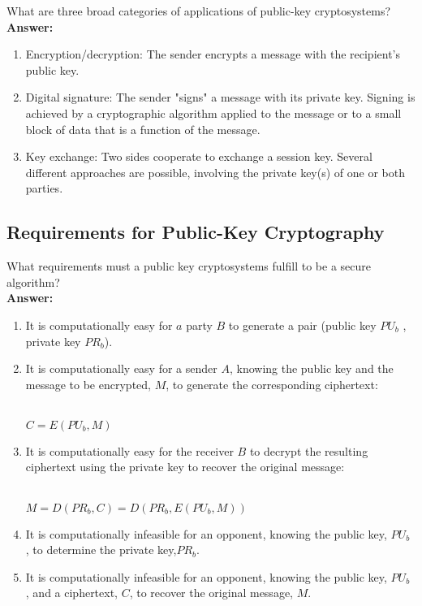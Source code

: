 \documentclass[paper=a4, fontsize=11pt]{scrartcl} %
\numberwithin{equation}{section} %
\numberwithin{figure}{section} %
\numberwithin{table}{section} %
\begin{document}
What are three broad categories of applications of public-key cryptosystems?\\

\textbf{Answer:}

 \begin{enumerate}
 \item Encryption/decryption: The sender encrypts a message with the recipient's public key.
 \item Digital signature: The sender "signs" a message with its private key. Signing is achieved by a cryptographic algorithm applied to the message or to a small block of data that is a function of the message.
 \item Key exchange: Two sides cooperate to exchange a session key. Several different approaches are possible, involving the private key(s) of one or both parties.
 \end{enumerate}

\subsection{Requirements for Public-Key Cryptography \uppercase\expandafter{}}

 What requirements must a public key cryptosystems fulfill to be a secure algorithm?\\

\textbf{Answer:}

 \begin{enumerate}
 \item It is computationally easy for $a$ party $B$ to generate a pair (public key $PU_{b}$ , private key $PR_{b}$).
 \item It is computationally easy for a sender $A$, knowing the public key and the message to be encrypted, $M$, to generate the corresponding ciphertext:\\
  \\
  \centerline{$C = E(PU_{b} , M)$}
 \item It is computationally easy for the receiver $B$ to decrypt the resulting ciphertext using the private key to recover the original message:\\
  \\
  \centerline{$M = D(PR_{b} , C) = D(PR_{b} , E(PU_{b} , M))$}
 \item It is computationally infeasible for an opponent, knowing the public key, $PU_{b}$ , to determine the private key,$PR_{b}$.
 \item It is computationally infeasible for an opponent, knowing the public key, $PU_{b}$ , and a ciphertext, $C$, to recover the original message, $M$.
 \end{enumerate}
\end{document}
